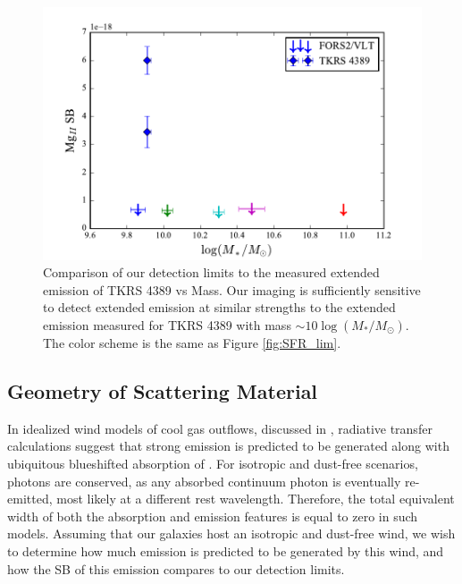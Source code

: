 \documentclass[twocolumn]{aastex61}
\begin{document}
\begin{figure}[!htb]
\centering
\includegraphics[scale=0.6]{../Figures/mass_limits.pdf}
\caption{Comparison of our detection limits to the measured extended emission of TKRS 4389 vs Mass. Our imaging is sufficiently sensitive to detect extended emission at similar strengths to the extended emission measured for TKRS 4389 with mass $\sim 10 \log(M_*/ M_{\odot})$. The color scheme is the same as Figure \ref{fig:SFR_lim}.}
\label{fig:detection_lim}
\end{figure}

\subsection{Geometry of Scattering Material}
In idealized wind models of cool gas outflows, discussed in \cite{Prochaska_2011}, radiative transfer calculations suggest that strong  emission is predicted to be generated along with ubiquitous blueshifted absorption of . For isotropic and dust-free scenarios, photons are conserved, as any absorbed continuum photon is eventually re-emitted, most likely at a different rest wavelength.  Therefore, the total equivalent width of both the absorption and emission features is equal to zero in such models. Assuming that our galaxies host an isotropic and dust-free wind, we wish to determine how much emission is predicted to be generated by this wind, and how the SB of this emission compares to our detection limits.
\end{document}
